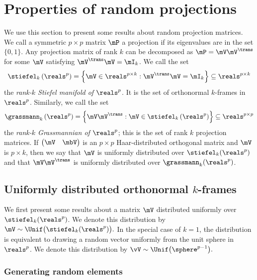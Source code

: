 
\chapter{Properties of random projections}

We use this section to present some results about random projection
matrices.  We call a symmetric $p \times p$ matrix $\mP$ a projection 
if its eigenvalues are in the set $\{ 0, 1 \}$.  Any projection matrix of rank
$k$ can be decomposed as $\mP = \mV \mV^\trans$ for some $\mV$
satisfying $\mV^\trans \mV = \mI_k$.  We call the set 
\[
    \stiefel_{k}\left( \reals^p \right)
        =
        \left\{
            \mV \in \reals^{p \times k}
            :
            \mV^\trans \mV = \mI_k
        \right\}
        \subseteq
        \reals^{p \times k}
\]
the \emph{rank-$k$ Stiefel manifold of $\reals^p$}.  It is the set
of orthonormal $k$-frames in $\reals^p$.  Similarly, we call 
the set
\[
    \grassmann_k\left( \reals^p \right)
        =
        \left\{
            \mV \mV^\trans
            :
            \mV \in \stiefel_k \left( \reals^p \right)
        \right\}
        \subseteq
        \reals^{p \times p}
\]
the \emph{rank-$k$ Grassmannian of $\reals^p$}; this is the set of
rank $k$ projection matrices.  If
\(
    \left(
    \begin{matrix}
        \mV & \mbV
    \end{matrix}
    \right)
\)
is an $p \times p$ Haar-distributed orthogonal matrix and $\mV$ is
$p \times k$, then we say that $\mV$ is uniformly distributed
over $\stiefel_k( \reals^p )$ and that $\mV \mV^\trans$ is uniformly
distributed over $\grassmann_k(\reals^p)$.


\section{Uniformly distributed orthonormal $k$-frames}

We first present some results about a matrix $\mV$ distributed uniformly
over $\stiefel_k(\reals^p)$.  We denote this distribution by
\(
    \mV 
        \sim
            \Unif \big(
                \stiefel_k(\reals^p)
            \big).
\)
In the special case of $k = 1$, the distribution is equivalent to drawing
a random vector uniformly from the unit sphere in $\reals^p$.  We denote
this distribution by
\(
    \vV
        \sim
            \Unif \big(
                \sphere^{p-1}
            \big).
\)


\subsection{Generating random elements}

